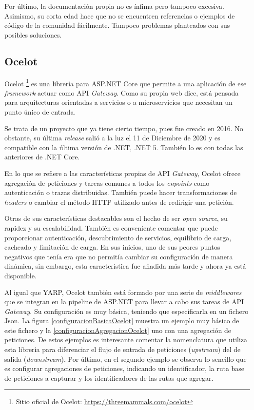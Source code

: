 \documentclass[11pt,spanish,listoffigures]{tfgetsinf}
\begin{document}
Por último, la documentación propia no es ínfima pero tampoco excesiva. Asimismo, su corta edad hace que no se encuentren referencias o ejemplos de código de la comunidad fácilmente. Tampoco problemas planteados con sus posibles soluciones.


		\subsection{Ocelot}

Ocelot \footnote{Sitio oficial de Ocelot: \url{https://threemammals.com/ocelot}} es una librería para ASP.NET Core que permite a una aplicación de ese \emph{framework} actuar como API \emph{Gateway}. Como su propia web dice, está pensada para arquitecturas orientadas a servicios o a microservicios que necesitan un punto único de entrada.

Se trata de un proyecto que ya tiene cierto tiempo, pues fue creado en 2016. No obstante, su última \emph{release} salió a la luz el 11 de Diciembre de 2020 y es compatible con la última versión de .NET, .NET 5. También lo es con todas las anteriores de .NET Core.

En lo que se refiere a las características propias de API \emph{Gateway}, Ocelot ofrece agregación de peticiones y tareas comunes a todos los \emph{enpoints} como autenticación o trazas distribuidas. También puede hacer transformaciones de \emph{headers} o cambiar el método HTTP utilizado antes de redirigir una petición.

Otras de sus características destacables son el hecho de ser \emph{open source}, su rapidez y su escalabilidad. También es conveniente comentar que puede proporcionar autenticación, descubrimiento de servicios, equilibrio de carga, cacheado y limitación de carga. En sus inicios, uno de sus peores puntos negativos que tenía era que no permitía cambiar su configuración de manera dinámica, sin embargo, esta característica fue añadida más tarde y ahora ya está disponible.

Al igual que YARP, Ocelot también está formado por una serie de \emph{middlewares} que se integran en la pipeline de ASP.NET para llevar a cabo sus tareas de API \emph{Gateway}. Su configuración es muy básica, teniendo que especificarla en un fichero Json. La figura \ref{configuracionBasicaOcelot} muestra un ejemplo muy básico de este fichero y la \ref{configuracionAgregacionOcelot} uno con una agregación de peticiones. De estos ejemplos es interesante comentar la nomenclatura que utiliza esta librería para diferenciar el flujo de entrada de peticiones (\emph{upstream}) del de salida (\emph{downstream}). Por último, en el segundo ejemplo se observa lo sencillo que es configurar agregaciones de peticiones, indicando un identificador, la ruta base de peticiones a capturar y los identificadores de las rutas que agregar.
\end{document}
